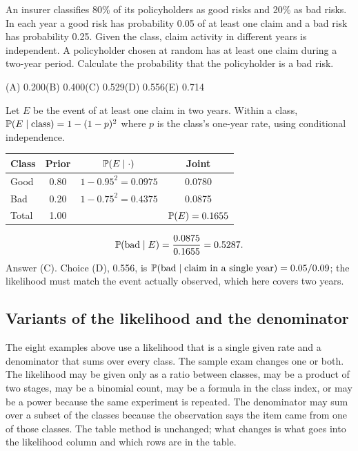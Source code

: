 \begin{example}
An insurer classifies 80\% of its policyholders as good risks and 20\% as bad risks. In each
year a good risk has probability 0.05 of at least one claim and a bad risk has probability
0.25. Given the class, claim activity in different years is independent. A policyholder
chosen at random has at least one claim during a two-year period. Calculate the probability
that the policyholder is a bad risk.
\par\smallskip\noindent (A) 0.200\qquad (B) 0.400\qquad (C) 0.529\qquad (D) 0.556\qquad (E) 0.714
\end{example}
\begin{solution}
Let $E$ be the event of at least one claim in two years. Within a class,
$\mathbb{P}(E \mid \text{class}) = 1 - (1 - p)^2$ where $p$ is the class's one-year rate, using
conditional independence.
\begin{center}
\begin{tabular}{@{}lccc@{}}
\toprule
Class & Prior & $\mathbb{P}(E \mid \cdot)$ & Joint \\
\midrule
Good & 0.80 & $1 - 0.95^2 = 0.0975$ & 0.0780 \\
Bad  & 0.20 & $1 - 0.75^2 = 0.4375$ & 0.0875 \\
\midrule
Total & 1.00 & & $\mathbb{P}(E) = 0.1655$ \\
\bottomrule
\end{tabular}
\end{center}
\[
\mathbb{P}(\text{bad} \mid E) = \frac{0.0875}{0.1655} = 0.5287.
\]
Answer (C). Choice (D), 0.556, is $\mathbb{P}(\text{bad} \mid \text{claim in a single year}) = 0.05/0.09$;
the likelihood must match the event actually observed, which here covers two years.
\end{solution}

\subsection{Variants of the likelihood and the denominator}

The eight examples above use a likelihood that is a single given rate and a denominator that
sums over every class. The sample exam changes one or both. The likelihood may be given only
as a ratio between classes, may be a product of two stages, may be a binomial count, may be a
formula in the class index, or may be a power because the same experiment is repeated. The
denominator may sum over a subset of the classes because the observation says the item came
from one of those classes. The table method is unchanged; what changes is what goes into the
likelihood column and which rows are in the table.

